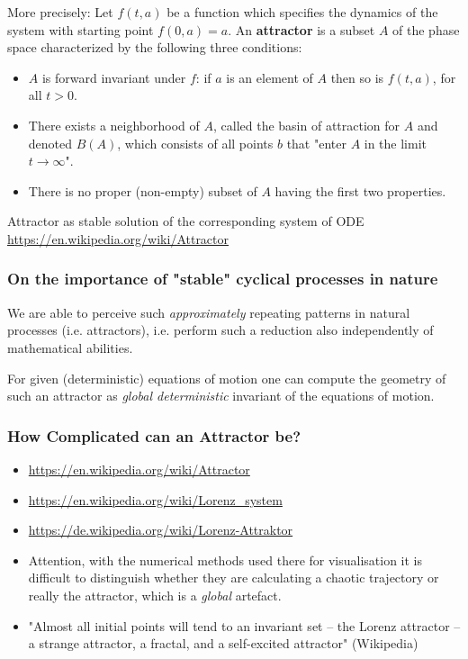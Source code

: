 \documentclass[11pt,a4paper]{article}
\begin{document}
More precisely: Let $f(t,a)$ be a function which specifies the dynamics of the
system with starting point $f(0,a)=a$. An \textbf{attractor} is a subset $A$
of the phase space characterized by the following three conditions:
\begin{itemize}
\item $A$ is forward invariant under $f$: if $a$ is an element of $A$ then so
  is $f(t,a)$, for all $t > 0$.  
\item There exists a neighborhood of $A$, called the basin of attraction for
  $A$ and denoted $B(A)$, which consists of all points $b$ that "enter $A$ in
  the limit $t\to\infty$".
\item There is no proper (non-empty) subset of $A$ having the first two
  properties.
\end{itemize}

Attractor as stable solution of the corresponding system of ODE\\
\url{https://en.wikipedia.org/wiki/Attractor}

\subsubsection*{On the importance of "stable" cyclical processes in nature}

We are able to perceive such \emph{approximately} repeating patterns in
natural processes (i.e. attractors), i.e.  perform such a reduction also
independently of mathematical abilities.

For given (deterministic) equations of motion one can compute the geometry of
such an attractor as \emph{global deterministic} invariant of the equations of
motion.
\newpage

\subsubsection*{How Complicated can an Attractor be?}
\begin{itemize}
\item \url{https://en.wikipedia.org/wiki/Attractor}
\item \url{https://en.wikipedia.org/wiki/Lorenz_system}
\item \url{https://de.wikipedia.org/wiki/Lorenz-Attraktor}
\item Attention, with the numerical methods used there for visualisation it is
  difficult to distinguish whether they are calculating a chaotic trajectory
  or really the attractor, which is a \emph{global} artefact.
\item "Almost all initial points will tend to an invariant set – the Lorenz
  attractor – a strange attractor, a fractal, and a self-excited attractor"
  (Wikipedia)
\end{itemize}
\end{document}
